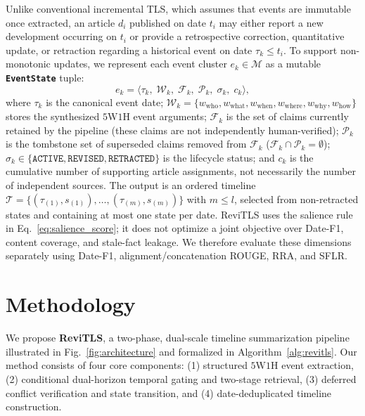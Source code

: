 \documentclass[journal]{IEEEtran}
\begin{document}
Unlike conventional incremental TLS, which assumes that events are immutable once extracted, an article $d_i$ published on date $t_i$ may either report a new development occurring on $t_i$ or provide a retrospective correction, quantitative update, or retraction regarding a historical event on date $\tau_k \le t_i$. To support non-monotonic updates, we represent each event cluster $e_k \in \mathcal{M}$ as a mutable \textbf{\texttt{EventState}} tuple:
\begin{equation}
e_k = \langle \tau_k,\; \mathcal{W}_k,\; \mathcal{F}_k,\; \mathcal{P}_k,\; \sigma_k,\; c_k \rangle,
\label{eq:event_state}
\end{equation}
where $\tau_k$ is the canonical event date; $\mathcal{W}_k = \{w_{\text{who}}, w_{\text{what}}, w_{\text{when}}, w_{\text{where}}, w_{\text{why}}, w_{\text{how}}\}$ stores the synthesized $5\text{W}1\text{H}$ event arguments; $\mathcal{F}_k$ is the set of claims currently retained by the pipeline (these claims are not independently human-verified); $\mathcal{P}_k$ is the tombstone set of superseded claims removed from $\mathcal{F}_k$ ($\mathcal{F}_k \cap \mathcal{P}_k = \emptyset$); $\sigma_k \in \{\texttt{ACTIVE}, \texttt{REVISED}, \texttt{RETRACTED}\}$ is the lifecycle status; and $c_k$ is the cumulative number of supporting article assignments, not necessarily the number of independent sources. The output is an ordered timeline $\mathcal{T} = \{(\tau_{(1)}, s_{(1)}), \dots, (\tau_{(m)}, s_{(m)})\}$ with $m \le l$, selected from non-retracted states and containing at most one state per date. ReviTLS uses the salience rule in Eq.~\eqref{eq:salience_score}; it does not optimize a joint objective over Date-F1, content coverage, and stale-fact leakage. We therefore evaluate these dimensions separately using Date-F1, alignment/concatenation ROUGE, RRA, and SFLR.

\section{Methodology}
\label{sec:methodology}

We propose \textbf{ReviTLS}, a two-phase, dual-scale timeline summarization pipeline illustrated in Fig.~\ref{fig:architecture} and formalized in Algorithm~\ref{alg:revitls}. Our method consists of four core components: (1) structured $5\text{W}1\text{H}$ event extraction, (2) conditional dual-horizon temporal gating and two-stage retrieval, (3) deferred conflict verification and state transition, and (4) date-deduplicated timeline construction.
\end{document}
